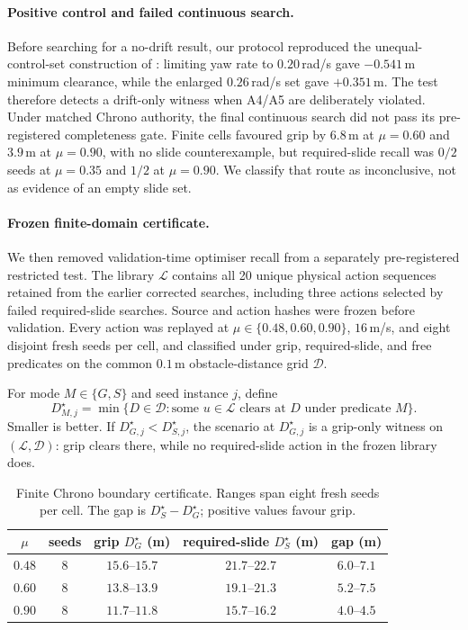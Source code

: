 \documentclass[11pt]{article}
\begin{document}
\paragraph{Positive control and failed continuous search.}
Before searching for a no-drift result, our protocol reproduced the unequal-control-set construction
of \citet{zhao2022justifying}: limiting yaw rate to $0.20$\,rad/s gave $-0.541$\,m minimum clearance,
while the enlarged $0.26$\,rad/s set gave $+0.351$\,m. The test therefore detects a drift-only witness
when A4/A5 are deliberately violated. Under matched Chrono authority, the final continuous search
did not pass its pre-registered completeness gate. Finite cells favoured grip by $6.8$\,m at
$\mu=0.60$ and $3.9$\,m at $\mu=0.90$, with no slide counterexample, but required-slide recall was
$0/2$ seeds at $\mu=0.35$ and $1/2$ at $\mu=0.90$. We classify that route as inconclusive, not as
evidence of an empty slide set.

\paragraph{Frozen finite-domain certificate.}
We then removed validation-time optimiser recall from a separately pre-registered restricted test.
The library $\mathcal L$ contains all 20 unique physical action sequences retained from the earlier
corrected searches, including three actions selected by failed required-slide searches. Source and
action hashes were frozen before validation. Every action was replayed at
$\mu\in\{0.48,0.60,0.90\}$, $16$\,m/s, and eight disjoint fresh seeds per cell, and classified under
grip, required-slide, and free predicates on the common $0.1$\,m obstacle-distance grid
$\mathcal D$.

For mode $M\in\{G,S\}$ and seed instance $j$, define
\begin{equation}
  D^\star_{M,j}=\min\{D\in\mathcal D:\text{some }u\in\mathcal L
  \text{ clears at }D\text{ under predicate }M\}.
  \label{eq:dstar}
\end{equation}
Smaller is better. If $D^\star_{G,j}<D^\star_{S,j}$, the scenario at
$D^\star_{G,j}$ is a grip-only witness on $(\mathcal L,\mathcal D)$: grip clears there, while no
required-slide action in the frozen library does.

\begin{table}[H]
\centering
\caption{Finite Chrono boundary certificate. Ranges span eight fresh seeds per cell. The gap is
$D_S^\star-D_G^\star$; positive values favour grip.}
\label{tab:preslip-certificate}
\begin{tabular}{ccccc}
\toprule
$\mu$ & seeds & grip $D_G^\star$ (m) & required-slide $D_S^\star$ (m) & gap (m) \\
\midrule
$0.48$ & $8$ & $15.6$--$15.7$ & $21.7$--$22.7$ & $6.0$--$7.1$ \\
$0.60$ & $8$ & $13.8$--$13.9$ & $19.1$--$21.3$ & $5.2$--$7.5$ \\
$0.90$ & $8$ & $11.7$--$11.8$ & $15.7$--$16.2$ & $4.0$--$4.5$ \\
\bottomrule
\end{tabular}
\end{table}
\end{document}
